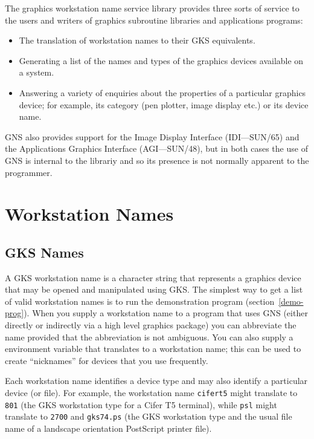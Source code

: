 \documentclass[twoside,11pt]{article}
\newcommand{\hyperref}[4]{#2\ref{#4}#3}
\newcommand{\xref}[3]{#1}
\newcommand{\xlabel}[1]{}
\renewcommand{\_}{\texttt{\symbol{95}}}
\begin{document}
The graphics workstation name service library provides three sorts of service
to the users and writers of graphics subroutine libraries and applications
programs:

\begin{itemize}

\item The translation of workstation names to their GKS equivalents.

\item Generating a list of the names and types of the graphics devices
available on a system.

\item Answering a variety of enquiries about the properties of a particular
graphics device; for example, its category (pen plotter, image display
etc.) or its device name.

\end{itemize}

GNS also provides support for the Image Display Interface
(IDI---\xref{SUN/65}{sun65}{}) and the
Applications Graphics Interface (AGI---\xref{SUN/48}{sun48}{}),
but in both cases the use of GNS
is internal to the librariy and so its presence is not normally
apparent to the programmer.

\section{Workstation Names}\label{wn}
\subsection{\xlabel{GKSWorkstationNames}GKS Names}

A GKS workstation name is a character string that represents a graphics device
that may be opened and manipulated using GKS.
The simplest way to get a list of valid workstation names is to run the
\hyperref{demonstration program}{demonstration program (section~}{}{demo-prog}).
When you supply a workstation name to a program that uses GNS (either directly
or indirectly via a high level graphics package) you can abbreviate the name
provided that the abbreviation is not ambiguous. You can also supply a
environment variable that translates to a workstation name; this can be
used to create ``nicknames'' for devices that you use frequently.

Each workstation name identifies a device type and may also identify a
particular device (or file). For example, the workstation name {\tt cifer\_t5}
might translate to {\tt 801} (the GKS workstation type for a Cifer T5
terminal), while {\tt ps\_l} might translate to {\tt 2700} and {\tt gks74.ps}
(the GKS workstation type and the usual file name of a landscape
orientation PostScript printer file).
\end{document}
